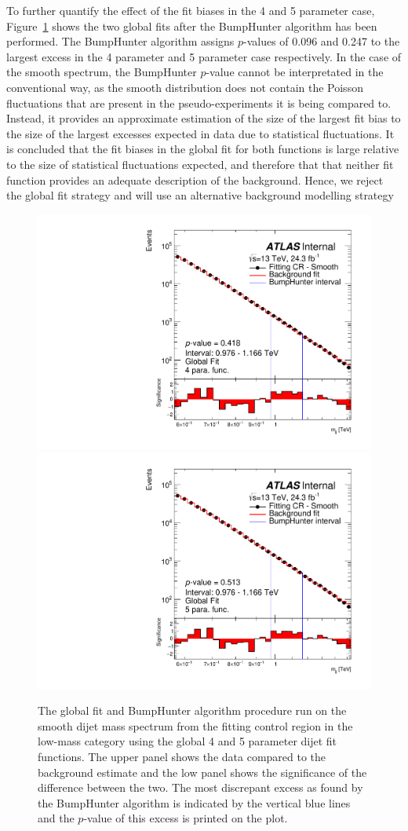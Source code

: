 To further quantify the effect of the fit biases in the 4 and 5 parameter case,
Figure~\ref{fig:bhFit_lm_global} shows the two global fits after the {\sc BumpHunter} algorithm has been performed.
The {\sc BumpHunter} algorithm assigns \mbox{$p$-values} of 0.096 and 0.247 to the largest excess in the 4 parameter and 5 parameter case respectively.
In the case of the smooth spectrum, the {\sc BumpHunter} \mbox{$p$-value} cannot be interpretated in the conventional way,
as the smooth distribution does not contain the Poisson fluctuations that are present in the pseudo-experiments it is being compared to.
Instead, it provides an approximate estimation of the size of the largest fit bias to the size of the largest excesses expected in data due to statistical fluctuations.
It is concluded that the fit biases in the global fit for both functions is large relative to the size of statistical fluctuations expected,
and therefore that that neither fit function provides an adequate description of the background.
Hence, we reject the global fit strategy and will use an alternative background modelling strategy

\begin{figure}[!htb]
\captionsetup[subfigure]{aboveskip=0pt,justification=centering}
\centering
{} {
  \includegraphics[width=0.45\linewidth, angle=0]{figs/Dibjet/LowMass/FitStudy_min566/globalFit_lm_bH_4para.pdf}
}
 {
  \includegraphics[width=0.45\linewidth, angle=0]{figs/Dibjet/LowMass/FitStudy_min566/globalFit_lm_bH_5para.pdf}
}
\vspace{10pt}
\caption{\label{fig:bhFit_lm_global}
  The global fit and {\sc BumpHunter} algorithm procedure run on the smooth dijet mass spectrum from the fitting control region in the low-mass category
  using the global 4 and 5 parameter dijet fit functions.
  The upper panel shows the data compared to the background estimate and the low panel shows the significance of the difference between the two.
  The most discrepant excess as found by the {\sc BumpHunter} algorithm is indicated by the vertical blue lines and the \mbox{$p$-value} of this excess is printed on the plot. }
\end{figure}

